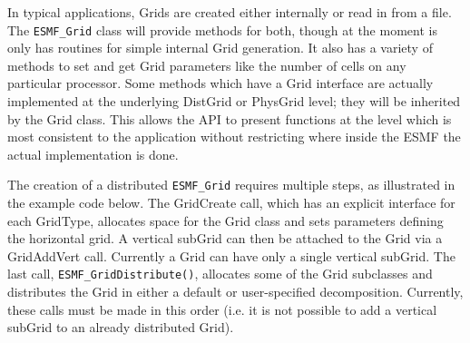 


In typical applications, Grids are created either internally or read in from
a file.  The {\tt ESMF\_Grid} class will provide methods for both, though at 
the moment is only has routines for simple internal Grid generation.  It also
has a variety of methods to set and get Grid parameters like the number of cells
on any particular processor.  Some methods which have a Grid interface are
actually implemented at the underlying DistGrid or PhysGrid level; they will be
inherited by the Grid class.  This allows the API to present functions at the
level which is most consistent to the application without restricting where
inside the ESMF the actual implementation is done.

The creation of a distributed {\tt ESMF\_Grid} requires multiple steps, as
illustrated in the example code below.  The GridCreate call, which has an
explicit interface for each GridType, allocates space for the Grid class and sets
parameters defining the horizontal grid.  A vertical subGrid can then be attached
to the Grid via a GridAddVert call.  Currently a Grid can have only a single
vertical subGrid.  The last call, {\tt ESMF\_GridDistribute()}, allocates some of
the Grid subclasses and distributes the Grid in either a default or
user-specified decomposition.  Currently, these calls must be made in this order
(i.e. it is not possible to add a vertical subGrid to an already distributed
Grid).


